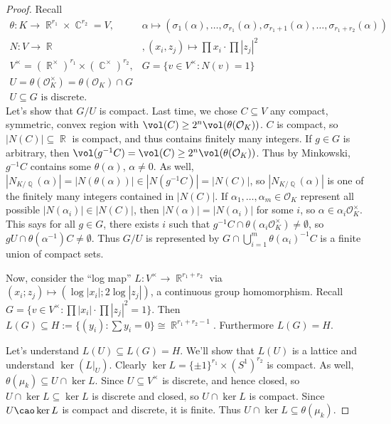 \documentclass[11pt, a4paper]{memoir}
\DeclareMathOperator{\Q}{{\mathbb{Q}}}
\DeclareMathOperator{\R}{{\mathbb{R}}}
\DeclareMathOperator{\C}{{\mathbb{C}}}
\theoremstyle{change}
\theoremstyle{plain}
\theoremstyle{nonumberplain}
\newtheorem{proof}{Proof}
\numberwithin{equation}{section}
\begin{document}
\begin{proof}
    Recall
    \begin{align*}
        \theta:K\to\R^{r_1}\times\C^{r_2}=V,&\alpha\mapsto(\sigma_1(\alpha),\ldots,\sigma_{r_1}(\alpha),\sigma_{r_1+1}(\alpha),\ldots,\sigma_{r_1+r_2}(\alpha))\\
        N:V\to\R &, (x_i,z_j)\mapsto \prod x_i\cdot \prod|z_j|^2\\
        V^\times = (\R^\times)^{r_1}\times(\C^\times)^{r_2},&G=\{v\in V^\times:N(v)=1\}\\
        U = \theta(\mathcal{O}_K^\times)=\theta(\mathcal{O}_K)\cap G\\
        U\subseteq G\text{ is discrete.}
    \end{align*}
    Let's show that $G/U$ is compact.
    Last time, we chose $C\subseteq V$ any compact, symmetric, convex region with $\vol(C)\geq 2^n\vol(\theta(\mathcal{O}_K))$.
    $C$ is compact, so $|N(C)|\subseteq\R$ is compact, and thus contains finitely many integers.
    If $g\in G$ is arbitrary, then $\vol(g^{-1}C)=\vol(C)\geq 2^n\vol(\theta(\mathcal{O}_K))$.
    Thus by Minkowski, $g^{-1}C$ contains some $\theta(\alpha)$, $\alpha\neq 0$.
    As well, $|N_{K/\Q}(\alpha)|=|N(\theta(\alpha))|\in|N(g^{-1}C)|=|N(C)|$, so $|N_{K/\Q}(\alpha)|$ is one of the finitely many integers contained in $|N(C)|$.
    If $\alpha_1,\ldots,\alpha_m\in\mathcal{O}_K$ represent all possible $|N(\alpha_i)|\in|N(C)|$, then $|N(\alpha)|=|N(\alpha_i)|$ for some $i$, so $\alpha\in\alpha_i\mathcal{O}_K^\times$.
    This says for all $g\in G$, there exists $i$ such that $g^{-1}C\cap\theta(\alpha_i\mathcal{O}_K^\times)\neq\emptyset$, so $gU\cap\theta(\alpha^{-1})C\neq\emptyset$.
    Thus $G/U$ is represented by $G\cap\bigcup_{i=1}^m\theta(\alpha_i)^{-1}C$ is a finite union of compact sets.

    Now, consider the ``log map'' $L:V^\times\to\R^{r_1+r_2}$ via $(x_i;z_j)\mapsto(\log|x_i|;2\log|z_j|)$, a continuous group homomorphism.
    Recall $G=\{v\in V^\times:\prod|x_i|\cdot\prod|z_j|^2=1\}$.
    Then $L(G)\subseteq H:=\{(y_i):\sum y_i=0\}\cong\R^{r_1+r_2-1}$.
    Furthermore $L(G)=H$.

    Let's understand $L(U)\subseteq L(G)=H$.
    We'll show that $L(U)$ is a lattice and understand $\ker(L|_U)$.
    Clearly $\ker L=\{\pm 1\}^{r_1}\times (S^1)^{r_2}$ is compact.
    As well, $\theta(\mu_k)\subseteq U\cap\ker L$.
    Since $U\subseteq V^\times$ is discrete, and hence closed, so $U\cap\ker L\subseteq\ker L$ is discrete and closed, so $U\cap\ker L$ is compact.
    Since $U\cao\ker L$ is compact and discrete, it is finite.
    Thus $U\cap \ker L\subseteq\theta(\mu_k)$.


\end{proof}
\end{document}
